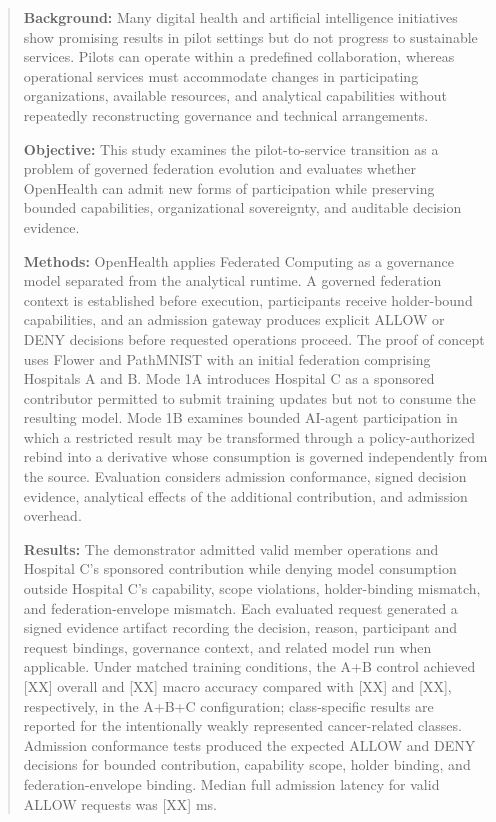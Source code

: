\documentclass[twoside,11pt]{article}
\begin{document}
\begin{abstract}
\textbf{Background:} Many digital health and artificial intelligence initiatives show promising results in pilot settings but do not progress to sustainable services. Pilots can operate within a predefined collaboration, whereas operational services must accommodate changes in participating organizations, available resources, and analytical capabilities without repeatedly reconstructing governance and technical arrangements.

\textbf{Objective:} This study examines the pilot-to-service transition as a problem of governed federation evolution and evaluates whether OpenHealth can admit new forms of participation while preserving bounded capabilities, organizational sovereignty, and auditable decision evidence.

\textbf{Methods:} OpenHealth applies Federated Computing as a governance model separated from the analytical runtime. A governed federation context is established before execution, participants receive holder-bound capabilities, and an admission gateway produces explicit ALLOW or DENY decisions before requested operations proceed. The proof of concept uses Flower and PathMNIST with an initial federation comprising Hospitals A and B. Mode 1A introduces Hospital C as a sponsored contributor permitted to submit training updates but not to consume the resulting model. Mode 1B examines bounded AI-agent participation in which a restricted result may be transformed through a policy-authorized rebind into a derivative whose consumption is governed independently from the source. Evaluation considers admission conformance, signed decision evidence, analytical effects of the additional contribution, and admission overhead.

\textbf{Results:} The demonstrator admitted valid member operations and Hospital C's sponsored contribution while denying model consumption outside Hospital C's capability, scope violations, holder-binding mismatch, and federation-envelope mismatch. Each evaluated request generated a signed evidence artifact recording the decision, reason, participant and request bindings, governance context, and related model run when applicable. Under matched training conditions, the A+B control achieved [XX] overall and [XX] macro accuracy compared with [XX] and [XX], respectively, in the A+B+C configuration; class-specific results are reported for the intentionally weakly represented cancer-related classes. Admission conformance tests produced the expected ALLOW and DENY decisions for bounded contribution, capability scope, holder binding, and federation-envelope binding. Median full admission latency for valid ALLOW requests was [XX] ms.


\end{abstract}
\end{document}
